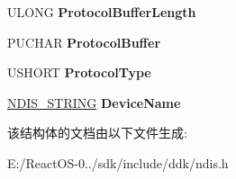 \begin{DoxyCompactItemize}
U\+L\+O\+NG {\bfseries Protocol\+Buffer\+Length}
\item 
\mbox{\label{struct___n_d_i_s___w_a_n___l_i_n_e___u_p_a460b5f1aa615a01556ec44374ded7c5e}} 
P\+U\+C\+H\+AR {\bfseries Protocol\+Buffer}
\item 
\mbox{\label{struct___n_d_i_s___w_a_n___l_i_n_e___u_p_a9d11fb2f1cdb538961cf435b756759c4}} 
U\+S\+H\+O\+RT {\bfseries Protocol\+Type}
\item 
\mbox{\label{struct___n_d_i_s___w_a_n___l_i_n_e___u_p_ab001855db24025bd0cc907920bd983d5}} 
\hyperlink{struct___u_n_i_c_o_d_e___s_t_r_i_n_g}{N\+D\+I\+S\+\_\+\+S\+T\+R\+I\+NG} {\bfseries Device\+Name}
\end{DoxyCompactItemize}


该结构体的文档由以下文件生成\+:\begin{DoxyCompactItemize}
\item 
E\+:/\+React\+O\+S-\/0../sdk/include/ddk/ndis.\+h\end{DoxyCompactItemize}

